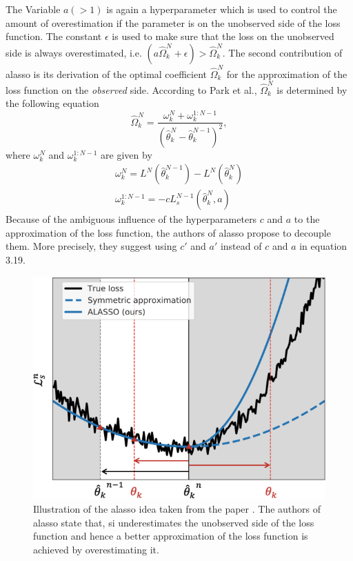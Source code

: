 The Variable $a (>1)$ is again a hyperparameter which is used to control the amount of overestimation if the parameter is on the unobserved side of the loss function.
The constant $\epsilon$ is used to make sure that the loss on the unobserved side is always overestimated, i.e. $(a \hat{\Omega}^N_k + \epsilon) > \hat{\Omega}^N_k$.
The second contribution of \gls{alasso} is its derivation of the optimal coefficient $\hat{\Omega}^N_k$ for the approximation of the loss function on the \textit{observed}
side. According to Park et al., $\hat{\Omega}^N_k$ is determined by the following equation
\begin{equation} \label{eq:ALASSO_Omega}
    \hat{\Omega}^N_k = \frac{\omega^N_k + \omega^{1:N-1}_k}{(\hat{\theta}^N_k - \hat{\theta}^{N-1}_k)^2},
\end{equation}
where $\omega^N_k$ and $\omega^{1:N-1}_k$ are given by
\begin{gather}
    \omega^N_k = L^N(\hat{\theta}^{N-1}_k) - L^N(\hat{\theta}^N_k) \\
    \omega^{1:N-1}_k = -cL^{N-1}_s(\hat{\theta}^N_k,a)
\end{gather}
Because of the ambiguous influence of the hyperparameters $c$ and $a$ to the approximation of the loss function, the authors of \gls{alasso} propose to decouple them. More
precisely, they suggest using $c'$ and $a'$ instead of $c$ and $a$ in equation 3.19.

\begin{figure} [ht]
    \centering
    \includegraphics[width=.9\linewidth]{images/Alasso_Idea.png}
    \caption[Visualization of ALASSO]{Illustration of the \gls{alasso} idea taken from the paper \cite{park2019continual}. The authors of \gls{alasso} state that, \gls{si}
    underestimates the unobserved side of the loss function and hence a better approximation of the loss function is achieved by overestimating it.}
    \label{fig:Alasso}
\end{figure}

